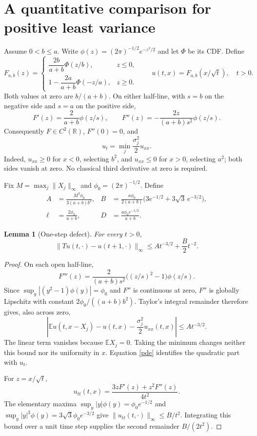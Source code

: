 \documentclass[10pt,a4paper]{article}
\newtheorem{lemma}[theorem]{Lemma}
\newcommand{\E}{\mathbb E}
\newcommand{\R}{\mathbb R}
\begin{document}
\section{A quantitative comparison for positive least variance}
Assume $0<b\le a$. Write $\phi(z)=(2\pi)^{-1/2}e^{-z^2/2}$ and let $\Phi$
be its CDF. Define
\begin{equation}\label{profile}
 F_{a,b}(z)=
 \begin{cases}
 \dfrac{2b}{a+b}\Phi(z/b),&z\le0,\\[3pt]
 1-\dfrac{2a}{a+b}\Phi(-z/a),&z\ge0.
 \end{cases}
 \qquad u(t,x)=F_{a,b}(x/\sqrt t),\quad t>0.
\end{equation}
Both values at zero are $b/(a+b)$. On either half-line, with $s=b$ on the
negative side and $s=a$ on the positive side,
\[
 F'(z)=\frac{2}{a+b}\phi(z/s),\qquad
 F''(z)=-\frac{2z}{(a+b)s^2}\phi(z/s).
\]
Consequently $F\in C^2(\R)$, $F''(0)=0$, and
\begin{equation}\label{pde}
 u_t=\min_j\frac{\sigma_j^2}{2}u_{xx}.
\end{equation}
Indeed, $u_{xx}\ge0$ for $x<0$, selecting $b^2$, and $u_{xx}\le0$ for $x>0$,
selecting $a^2$; both sides vanish at zero. No classical third derivative at
zero is required.

Fix $M=\max_j\|X_j\|_\infty$ and $\phi_0=(2\pi)^{-1/2}$. Define
\begin{align*}
 A&=\frac{M^3\phi_0}{3(a+b)b^2},&
 B&=\frac{a\phi_0}{2(a+b)}
       \bigl(3e^{-1/2}+3\sqrt3\,e^{-3/2}\bigr),\\
 \ell&=\frac{2\phi_0}{a+b},&
 D&=\frac{a\phi_0 e^{-1/2}}{a+b}.
\end{align*}

\begin{lemma}[One-step defect]\label{local}
For every $t>0$,
\begin{equation}\label{defect}
 \|Tu(t,\cdot)-u(t+1,\cdot)\|_\infty
 \le A t^{-3/2}+\frac B2 t^{-2}.
\end{equation}
\end{lemma}
\begin{proof}
On each open half-line,
\[
 F'''(z)=\frac{2}{(a+b)s^2}\bigl((z/s)^2-1\bigr)\phi(z/s).
\]
Since $\sup_y|(y^2-1)\phi(y)|=\phi_0$ and $F''$ is continuous at zero,
$F''$ is globally Lipschitz with constant $2\phi_0/((a+b)b^2)$.
Taylor's integral remainder therefore gives, also across zero,
\[
 \left|\E u(t,x-X_j)-u(t,x)-\frac{\sigma_j^2}{2}u_{xx}(t,x)\right|
 \le A t^{-3/2}.
\]
The linear term vanishes because $\E X_j=0$. Taking the minimum changes
neither this bound nor its uniformity in $x$. Equation \eqref{pde} identifies
the quadratic part with $u_t$.

For $z=x/\sqrt t$,
\[
 u_{tt}(t,x)=\frac{3zF'(z)+z^2F''(z)}{4t^2}.
\]
The elementary maxima $\sup_y|y|\phi(y)=\phi_0e^{-1/2}$ and
$\sup_y|y|^3\phi(y)=3\sqrt3\phi_0e^{-3/2}$ give
$\|u_{tt}(t,\cdot)\|_\infty\le B/t^2$. Integrating this bound over a
unit time step supplies the second remainder $B/(2t^2)$.
\end{proof}
\end{document}
